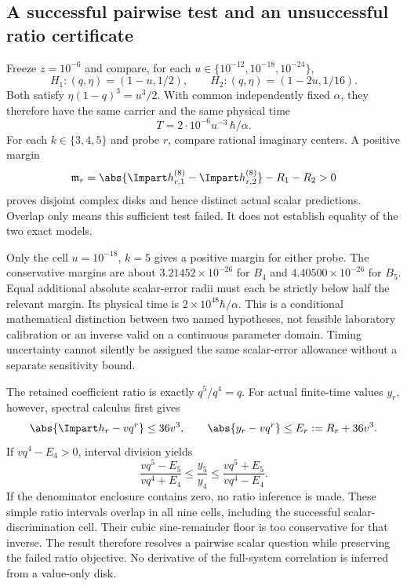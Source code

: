 \subsection{A successful pairwise test and an unsuccessful ratio certificate}
Freeze $z=10^{-6}$ and compare, for each $u\in\{10^{-12},10^{-18},10^{-24}\}$,
\begin{equation}
H_1:(q,\eta)=(1-u,1/2),\qquad H_2:(q,\eta)=(1-2u,1/16).
\label{r27:eq:hypotheses}
\end{equation}
Both satisfy $\eta(1-q)^3=u^3/2$. With common independently fixed $\alpha$, they therefore have the same carrier and the same physical time
\begin{equation}
T=2\cdot10^{-6}u^{-3}\,\hbar/\alpha.
\label{r27:eq:time2}
\end{equation}
For each $k\in\{3,4,5\}$ and probe $r$, compare rational imaginary centers. A positive margin
\begin{equation}
\mathfrak m_r=
\abs{\Impart h_{r,1}^{(8)}-\Impart h_{r,2}^{(8)}}-R_1-R_2>0
\label{r27:eq:margin}
\end{equation}
proves disjoint complex disks and hence distinct actual scalar predictions. Overlap only means this sufficient test failed. It does not establish equality of the two exact models.

Only the cell $u=10^{-18}$, $k=5$ gives a positive margin for either probe. The conservative margins are about $3.21452\times10^{-26}$ for $B_4$ and $4.40500\times10^{-26}$ for $B_5$. Equal additional absolute scalar-error radii must each be strictly below half the relevant margin. Its physical time is $2\times10^{48}\hbar/\alpha$. This is a conditional mathematical distinction between two named hypotheses, not feasible laboratory calibration or an inverse valid on a continuous parameter domain. Timing uncertainty cannot silently be assigned the same scalar-error allowance without a separate sensitivity bound.

The retained coefficient ratio is exactly $q^5/q^4=q$. For actual finite-time values $y_r$, however, spectral calculus first gives
\begin{equation}
\abs{\Impart h_r-vq^r}\le36v^3,\qquad
\abs{y_r-vq^r}\le E_r:=R_r+36v^3.
\label{r27:eq:ratioerror}
\end{equation}
If $vq^4-E_4>0$, interval division yields
\begin{equation}
\frac{vq^5-E_5}{vq^4+E_4}\le\frac{y_5}{y_4}\le
\frac{vq^5+E_5}{vq^4-E_4}.
\label{r27:eq:ratio}
\end{equation}
If the denominator enclosure contains zero, no ratio inference is made. These simple ratio intervals overlap in all nine cells, including the successful scalar-discrimination cell. Their cubic sine-remainder floor is too conservative for that inverse. The result therefore resolves a pairwise scalar question while preserving the failed ratio objective. No derivative of the full-system correlation is inferred from a value-only disk.

